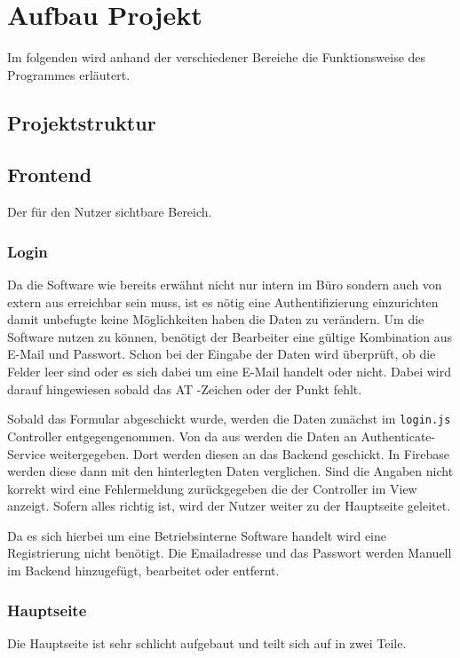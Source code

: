 \chapter{Aufbau Projekt}
Im folgenden wird anhand der verschiedener Bereiche die Funktionsweise des Programmes erläutert. 

\section{Projektstruktur}



\section{Frontend}
Der für den Nutzer sichtbare Bereich.
\subsection{Login}
Da die Software wie bereits erwähnt nicht nur intern im Büro sondern auch von extern aus erreichbar sein muss, ist es nötig eine Authentifizierung einzurichten damit unbefugte keine Möglichkeiten haben die Daten zu verändern. Um die Software nutzen zu können, benötigt der Bearbeiter eine gültige Kombination aus E-Mail und Passwort. Schon bei der Eingabe der Daten wird überprüft, ob die Felder leer sind oder es sich dabei um eine E-Mail handelt oder nicht. Dabei wird darauf hingewiesen sobald das AT -Zeichen oder der Punkt fehlt. 

Sobald das Formular abgeschickt wurde, werden die Daten zunächst im \texttt{login.js} Controller entgegengenommen. Von da aus werden die Daten an Authenticate-Service weitergegeben. Dort werden diesen an das Backend geschickt. In Firebase werden diese dann mit den hinterlegten Daten verglichen. Sind die Angaben nicht korrekt wird eine Fehlermeldung zurückgegeben die der Controller im View anzeigt. Sofern alles richtig ist, wird der Nutzer weiter zu der Hauptseite geleitet. 

Da es sich hierbei um eine Betriebsinterne Software handelt wird eine Registrierung nicht benötigt. Die Emailadresse und das Passwort werden Manuell im Backend hinzugefügt, bearbeitet oder entfernt. 

\subsection{Hauptseite}
Die Hauptseite ist sehr schlicht aufgebaut und teilt sich auf in zwei Teile. 

